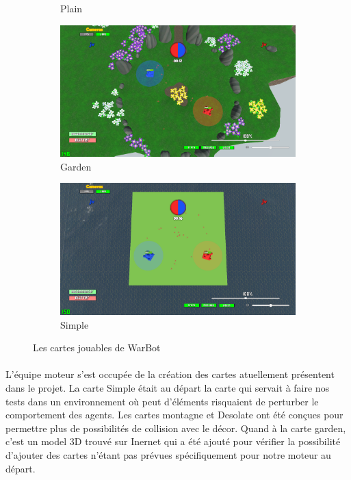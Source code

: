 \documentclass{report}
\begin{document}
\begin{figure}
\begin{adjustwidth}{-8em}{-7em}
\begin{subfigure}{.5\textwidth}
  \caption{Plain}
  \label{fig:sfig3}
\end{subfigure}
\newline
\begin{center}
\begin{subfigure}{.5\textwidth}
  \centering
  \includegraphics[scale=0.1]{DATA/jardin.png}
  \caption{Garden}
  \label{fig:sfig3}
\end{subfigure}
\begin{subfigure}{.5\textwidth}
  \centering
  \includegraphics[scale=0.1]{DATA/test.png}
  \caption{Simple}
  \label{fig:sfig3}
\end{subfigure}
\caption{Les cartes jouables de WarBot}
\label{fig:fig}
\end{center}
\end{adjustwidth}
\end{figure}
\paragraph{}

  L’équipe moteur s’est occupée de la création des cartes atuellement présentent dans le projet. La carte Simple était au départ la carte qui servait à faire nos tests dans un environnement où peut d'éléments risquaient de perturber le comportement des agents. Les cartes montagne et Desolate ont été conçues pour permettre plus de possibilités de collision avec le décor. Quand à la carte garden, c'est un model 3D trouvé sur Inernet qui a été ajouté pour vérifier la possibilité d'ajouter des cartes n'étant pas prévues spécifiquement pour notre moteur au départ.
\end{document}
